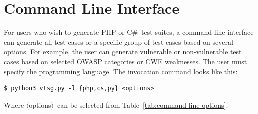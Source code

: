 \documentclass[12pt]{article}
\newcommand{\CSharp}{C{\fontseries{b}\selectfont\#}}
\begin{document}
\section{Command Line Interface}
\label{sec:command line interface}

For users who wish to generate PHP or \CSharp\ test suites, a command line interface
can generate all test cases or a specific group of test cases based on several
options.  For example, the user can generate vulnerable or non-vulnerable test cases
based on selected OWASP categories or CWE weaknesses.  The user must specify the
programming language.  The invocation command looks like this:
\begin{verbatim}
$ python3 vtsg.py -l {php,cs,py} <options>
\end{verbatim}

\newcommand{\texlangle}{$\langle$}
\newcommand{\texrangle}{$\rangle$}
Where \texlangle options\texrangle\ can be selected from 
Table~\ref{tab:command line options}.
\end{document}
